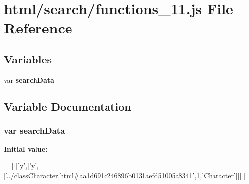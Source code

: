 \section{html/search/functions\-\_\-11.js File Reference}
\label{functions__11_8js}
\subsection*{Variables}
\begin{DoxyCompactItemize}
\item 
var {\bf search\-Data}
\end{DoxyCompactItemize}


\subsection{Variable Documentation}
\subsubsection[{search\-Data}]{\setlength{\rightskip}{0pt plus 5cm}var search\-Data}\label{functions__11_8js_ad01a7523f103d6242ef9b0451861231e}
{\bfseries Initial value\-:}
\begin{DoxyCode}
=
[
  [\textcolor{charliteral}{'y'},[\textcolor{charliteral}{'y'},[\textcolor{stringliteral}{'../classCharacter.html#aa1d691c246896b0131aefd51005a8341'},1,\textcolor{stringliteral}{'Character'}]]]
]
\end{DoxyCode}
